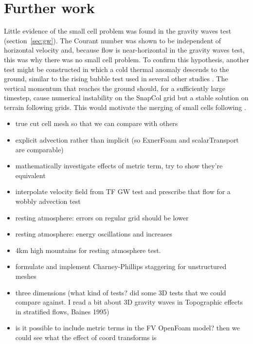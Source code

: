 \chapter{Further work}

Little evidence of the small cell problem was found in the gravity waves test (section~\ref{sec:gw}).  The Courant number was shown to be independent of horizontal velocity and, because flow is near-horizontal in the gravity waves test, this was why there was no small cell problem.  To confirm this hypothesis, another test might be constructed in which a cold thermal anomaly descends to the ground, similar to the rising bubble test used in several other studies \parencites{bonaventura2000}{jebens2011}{good2013}.  The vertical momentum that reaches the ground should, for a sufficiently large timestep, cause numerical instability on the SnapCol grid but a stable solution on terrain following grids.  This would motivate the merging of small cells following \textcite{yamazaki-satomura2010}.

\begin{itemize}
\item true cut cell mesh so that we can compare with others
\item explicit advection rather than implicit (so ExnerFoam and scalarTransport are comparable)
\item mathematically investigate effects of metric term, try to show they're equivalent
\item interpolate velocity field from TF GW test and prescribe that flow for a wobbly advection test
\item resting atmosphere: errors on regular grid should be lower
\item resting atmosphere: energy oscillations and increases
\item 4km high mountains for resting atmosphere test.
\item formulate and implement Charney-Phillips staggering for unstructured meshes
\item three dimensions (what kind of tests?  \textcite{lock2012} did some 3D tests that we could compare against.  I read a bit about 3D gravity waves in Topographic effects in stratified flows, Baines 1995) 
\item is it possible to include metric terms in the FV OpenFoam model?  then we could see what the effect of coord transforms is
\end{itemize}

